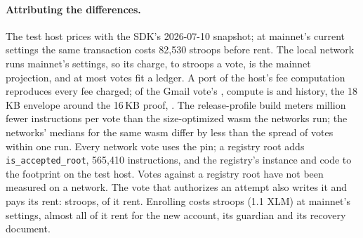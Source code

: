 \paragraph{Attributing the differences.} The test host prices with the
SDK's 2026-07-10 snapshot; at mainnet's current settings the same
transaction costs 82{,}530 stroops before
rent. The local network runs mainnet's
settings, so its charge,  to  stroops a
vote, is the mainnet projection, and at most  votes fit
a ledger.
A port of the host's fee computation reproduces every fee charged; of the
Gmail vote's , compute is  and history,
the 18\,KB envelope around the 16\,KB proof,
. The release-profile build meters
 million fewer instructions per vote than the
size-optimized wasm the networks run; the networks' medians for the same wasm
differ by less than the spread of votes within one
run. Every
network vote uses the pin;
a registry root adds \texttt{is\_accepted\_root}, 565{,}410 instructions, and
the registry's instance and code to the footprint on the test
host. Votes against a registry root have not been
measured on a network. The vote that authorizes an attempt also writes it
and pays its rent:  stroops,  of it
rent. Enrolling costs  stroops
(1.1 XLM) at mainnet's settings, almost all of it rent for the new
account, its guardian and its recovery document.

